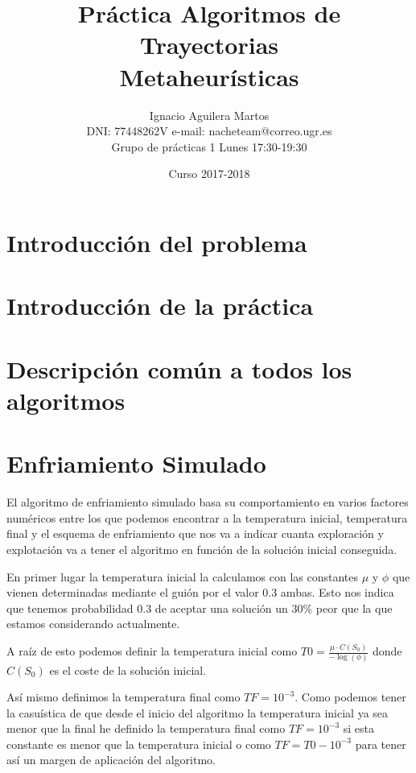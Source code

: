 \documentclass[12pt,a4paper]{article}
\author{Ignacio Aguilera Martos \\
	DNI: 77448262V       e-mail: nacheteam@correo.ugr.es \\
	Grupo de prácticas 1 Lunes 17:30-19:30}
\title{Práctica Algoritmos de Trayectorias \\ Metaheurísticas}
\date{Curso 2017-2018}
\begin{document}
	\maketitle

	\tableofcontents

	\newpage



	\section{Introducción del problema}
	\label{sec:introProblema}




	\section{Introducción de la práctica}
	\label{sec:introPractica}



	\newpage

	\section{Descripción común a todos los algoritmos}


	\newpage
	
	\section{Enfriamiento Simulado}
	\label{sec:ES}
	
	El algoritmo de enfriamiento simulado basa su comportamiento en varios factores numéricos entre los que podemos encontrar a la temperatura inicial, temperatura final y el esquema de enfriamiento que nos va a indicar cuanta exploración y explotación va a tener el algoritmo en función de la solución inicial conseguida.
	
	En primer lugar la temperatura inicial la calculamos con las constantes $\mu$ y $\phi$ que vienen determinadas mediante el guión por el valor 0.3 ambas. Esto nos indica que tenemos probabilidad 0.3 de aceptar una solución un 30\% peor que la que estamos considerando actualmente.
	
	A raíz de esto podemos definir la temperatura inicial como $T0 = \frac{\mu  \cdot C(S_0)}{-\log(\phi)}$ donde $C(S_0)$ es el coste de la solución inicial.
	
	Así mismo definimos la temperatura final como $TF=10^{-3}$. Como podemos tener la casuística de que desde el inicio del algoritmo la temperatura inicial ya sea menor que la final he definido la temperatura final como $TF=10^{-3}$ si esta constante es menor que la temperatura inicial o como $TF=T0-10^{-3}$ para tener así un margen de aplicación del algoritmo.
	
\end{document}
